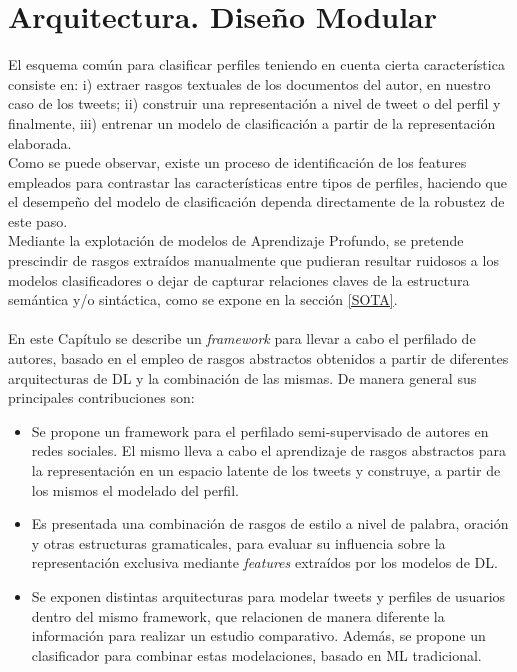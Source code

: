 
\chapter{Arquitectura. Diseño Modular}

	El esquema común para clasificar perfiles teniendo en cuenta cierta característica consiste en: i) extraer rasgos textuales de los documentos del autor, en nuestro caso de los tweets; ii) construir una representación a nivel de tweet o del perfil y finalmente, iii) entrenar un modelo de clasificación a partir de la representación elaborada. 
	\\
	Como se puede observar, existe un proceso de identificación de los features empleados para contrastar las características entre tipos de perfiles, haciendo que el desempeño del modelo de clasificación dependa directamente de la robustez de este paso. 
	\\
	Mediante la explotación de modelos de Aprendizaje Profundo, se pretende prescindir de rasgos extraídos manualmente que pudieran resultar ruidosos a los modelos clasificadores o dejar de capturar relaciones claves de la estructura semántica y/o sintáctica, como se expone en la sección \ref{SOTA}.
	\\\\
	En este Capítulo se describe un \textit{framework} para llevar a cabo el perfilado de autores, basado en el empleo de rasgos abstractos obtenidos a partir de diferentes arquitecturas de DL y la combinación de las mismas.
	De manera general sus principales contribuciones son:

	\begin{itemize}
			\item Se propone un framework para el perfilado semi-supervisado de autores en redes sociales. El mismo lleva a cabo el aprendizaje de rasgos abstractos para la representación en un espacio latente de los tweets y construye, a partir de los mismos el modelado del perfil.
			
			\item Es presentada una combinación de rasgos de estilo a nivel de palabra, oración y otras estructuras gramaticales, para evaluar su influencia sobre la representación exclusiva mediante \textit{features} extraídos por los modelos de DL. 
		
			\item  Se exponen distintas arquitecturas para modelar tweets y perfiles de usuarios dentro del mismo framework, que relacionen de manera diferente la información para realizar un estudio comparativo. Además, se propone un clasificador para combinar estas modelaciones, basado en ML tradicional.	
	\end{itemize}

